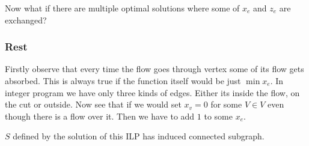 \documentclass{article}
\begin{document}
	Now what if there are multiple optimal solutions where some of $x_e$ and $z_e$ are exchanged?
	
	\subsubsection{Rest}
	
	Firstly observe that every time the flow goes through vertex some of its flow gets absorbed. This is always true if the function itself would be just $\min x_e$. In integer program we have only three kinds of edges. Either its inside the flow, on the cut or outside. Now see that if we would set $x_v = 0$ for some $V \in V$ even though there is a flow over it. Then we have to add $1$ to some $x_e$.
	
	$S$ defined by the solution of this ILP has induced connected subgraph.
\end{document}
